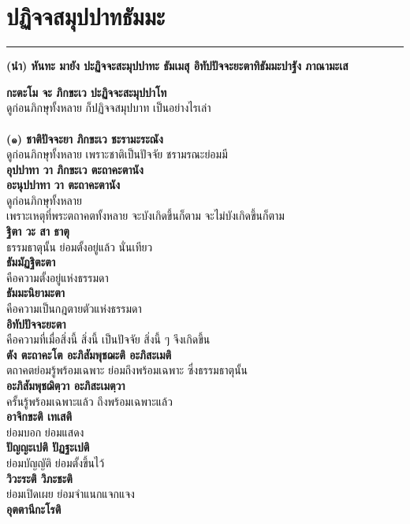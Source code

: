 \documentclass[12pt]{article}
\begin{document}
\section{ปฏิจจสมุปปาทธัมมะ}
\hrule
\begin{center}
\textbf{(นำ) หันทะ มายัง ปะฏิจจะสะมุปปาทะ ธัมเมสุ อิทัปปัจจะยะตาทิธัมมะปาฐัง ภาณามะเส}
\end{center}
\textbf{กะตะโม จะ ภิกขะเว ปะฏิจจะสะมุปปาโท}\\
\indent ดูก่อนภิกษุทั้งหลาย ก็ปฏิจจสมุปบาท เป็นอย่างไรเล่า\\
\\
\textbf{(๑) ชาติปัจจะยา ภิกขะเว ชะรามะระณัง}\\
\indent ดูก่อนภิกษุทั้งหลาย เพราะชาติเป็นปัจจัย ชรามรณะย่อมมี\\
\textbf{อุปปาทา วา ภิกขะเว ตะถาคะตานัง\\
อะนุปปาทา วา ตะถาคะตานัง}\\
\indent ดูก่อนภิกษุทั้งหลาย\\
\indent เพราะเหตุที่พระตถาคตทั้งหลาย จะบังเกิดขึ้นก็ตาม จะไม่บังเกิดขึ้นก็ตาม\\
\textbf{ฐิตา วะ สา ธาตุ}\\
\indent ธรรมธาตุนั้น ย่อมตั้งอยู่แล้ว นั่นเทียว\\
\textbf{ธัมมัฏฐิตะตา}\\
\indent คือความตั้งอยู่แห่งธรรมดา\\
\textbf{ธัมมะนิยามะตา}\\
\indent คือความเป็นกฎตายตัวแห่งธรรมดา\\
\textbf{อิทัปปัจจะยะตา}\\
\indent คือความที่เมื่อสิ่งนี้ สิ่งนี้ เป็นปัจจัย สิ่งนี้ ๆ จึงเกิดขึ้น\\
\textbf{ตัง ตะถาคะโต อะภิสัมพุชฌะติ อะภิสะเมติ}\\
\indent ตถาคตย่อมรู้พร้อมเฉพาะ ย่อมถึงพร้อมเฉพาะ ซึ่งธรรมธาตุนั้น\\
\textbf{อะภิสัมพุชฌิตฺวา อะภิสะเมตฺวา}\\
\indent ครั้นรู้พร้อมเฉพาะแล้ว ถึงพร้อมเฉพาะแล้ว\\
\textbf{อาจิกขะติ เทเสติ}\\
\indent ย่อมบอก ย่อมแสดง\\
\textbf{ปัญญะเปติ ปัฏฐะเปติ}\\
\indent ย่อมบัญญัติ ย่อมตั้งขึ้นไว้\\
\textbf{วิวะระติ วิภะชะติ}\\
\indent ย่อมเปิดเผย ย่อมจำแนกแจกแจง\\
\textbf{อุตตานีกะโรติ}\\
\end{document}
